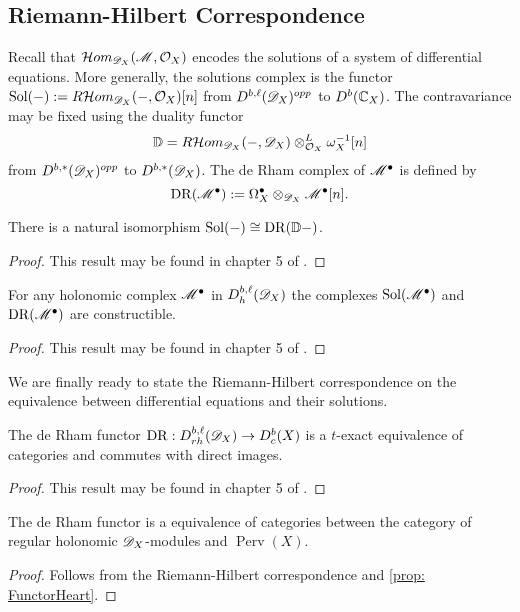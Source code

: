 \subsection{Riemann-Hilbert Correspondence}
  Recall that $\mathcal{H}om_{\mathscr{D}_X}(\mathscr{M}, \mathcal{O}_X)$ encodes the solutions of a system of differential equations.
  More generally, the solutions complex is the functor $\operatorname{Sol}({-}) := R \mathcal{H}om_{\mathscr{D}_X}({-},\mathcal{O}_X)[n]$ from $D^{b,\ell}(\mathscr{D}_X)^{opp}$ to $D^{b}(\mathbb{C}_X)$.
  The contravariance may be fixed using the duality functor
  $$\mathbb{D} = R\mathcal{H}om_{\mathscr{D}_X}({-},\mathscr{D}_X)\otimes_{\mathcal{O}_X}^L\omega_X^{-1}[n]$$
  from $D^{b,*}(\mathscr{D}_X)^{opp}$ to $D^{b,*}(\mathscr{D}_X)$.
  The de Rham complex of $\mathscr{M}^\bullet$ is defined by
  $$\operatorname{DR}(\mathscr{M}^\bullet):=\Omega_X^\bullet \otimes_{\mathscr{D}_X} \mathscr{M}^\bullet[n]. $$
  \begin{proposition}
    There is a natural isomorphism $\operatorname{Sol}({-}) \cong \operatorname{DR}(\mathbb{D}{-})$.
  \end{proposition}
  \begin{proof}
    This result may be found in chapter 5 of \cite{dimca2004sheaves}.
  \end{proof}
  \begin{proposition}
    For any holonomic complex $\mathscr{M}^\bullet$ in $D_h^{b,\ell}(\mathscr{D}_X)$ the complexes $\operatorname{Sol}(\mathscr{M}^\bullet)$ and $\operatorname{DR}(\mathscr{M}^\bullet)$ are constructible.
  \end{proposition}
  \begin{proof}
    This result may be found in chapter 5 of \cite{dimca2004sheaves}.
  \end{proof}
  We are finally ready to state the Riemann-Hilbert correspondence on the equivalence between differential equations and their solutions.
  \begin{theorem}
    The de Rham functor $\operatorname{DR}:D_{rh}^{b,\ell}(\mathscr{D}_X)\allowbreak \to D_c^b(X)$ is a $t$-exact equivalence of categories and commutes with direct images.
  \end{theorem}
  \begin{proof}
    This result may be found in chapter 5 of \cite{dimca2004sheaves}.
  \end{proof}
  \begin{corollary}
    The de Rham functor is a equivalence of categories between the category of regular holonomic $\mathscr{D}_X$-modules and $\operatorname{Perv}(X)$.
  \end{corollary}
  \begin{proof}
    Follows from the Riemann-Hilbert correspondence and \cref{prop: FunctorHeart}.
  \end{proof}
